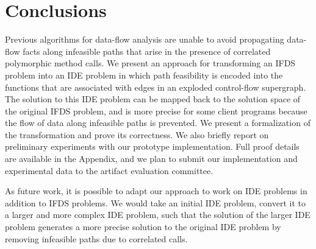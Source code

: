 \section{Conclusions}
  \label{sec:Conclusions}
  
Previous algorithms for data-flow analysis are unable to avoid propagating
data-flow facts along infeasible paths that arise in the presence of
correlated polymorphic method calls. 
% 
We present an approach for transforming an IFDS problem into an IDE problem
in which path feasibility is encoded into the functions that are associated
with edges in an exploded control-flow supergraph. The solution to this
IDE problem can be mapped back to the solution space of the original IFDS
problem, and is more precise for some client programs because the flow of data along
infeasible paths is prevented. We present a formalization of the
transformation and prove its correctness. We also briefly report on
preliminary experiments with our prototype implementation. Full proof
details are available in the Appendix,
and we plan to submit our implementation and experimental data to the
artifact evaluation committee. 
  
As future work, it is possible to adapt our approach to work on IDE
problems in addition to IFDS problems. We would take an initial IDE
problem, convert it to a larger and more complex IDE problem, such
that the solution of the larger IDE problem generates a more precise
solution to the original IDE problem by removing infeasible paths due to
correlated calls.
